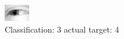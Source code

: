 \begin{figure}[h!]
\begin{center}
\includegraphics[width=0.60\columnwidth]{figures/ID2490_class_3_target_4.png}
\end{center}
\caption{ Classification: 3 actual target: 4}
\label{fig:ID2490_class_3_target_4}
\end{figure}
